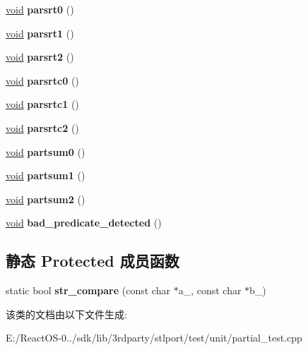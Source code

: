 \begin{DoxyCompactItemize}
\item 
\mbox{\label{class_partial_test_a91345c32abe2a6e55de3c51a1d4bc5a9}} 
\hyperlink{interfacevoid}{void} {\bfseries parsrt0} ()
\item 
\mbox{\label{class_partial_test_afd124d76300cdb873c047247e0a64426}} 
\hyperlink{interfacevoid}{void} {\bfseries parsrt1} ()
\item 
\mbox{\label{class_partial_test_a4b3d49b8299baf8c928e6d4f6fa3bc3e}} 
\hyperlink{interfacevoid}{void} {\bfseries parsrt2} ()
\item 
\mbox{\label{class_partial_test_aa0d81d1099ee5afb7064300d9ab556e8}} 
\hyperlink{interfacevoid}{void} {\bfseries parsrtc0} ()
\item 
\mbox{\label{class_partial_test_abb6b7dfbbed99a49d1a3453ed725819c}} 
\hyperlink{interfacevoid}{void} {\bfseries parsrtc1} ()
\item 
\mbox{\label{class_partial_test_a7d47771c59fdeeede4f60d7683fb53b6}} 
\hyperlink{interfacevoid}{void} {\bfseries parsrtc2} ()
\item 
\mbox{\label{class_partial_test_a91c392bb46c06cb71b73f9d4f6bce973}} 
\hyperlink{interfacevoid}{void} {\bfseries partsum0} ()
\item 
\mbox{\label{class_partial_test_a49f752d69cff7f00bf279a97b56ec1c9}} 
\hyperlink{interfacevoid}{void} {\bfseries partsum1} ()
\item 
\mbox{\label{class_partial_test_ace1656d0bc13a922a764ce8e258118d4}} 
\hyperlink{interfacevoid}{void} {\bfseries partsum2} ()
\item 
\mbox{\label{class_partial_test_ab59e2b5349f375758a7c9815113b68ce}} 
\hyperlink{interfacevoid}{void} {\bfseries bad\+\_\+predicate\+\_\+detected} ()
\end{DoxyCompactItemize}
\subsection*{静态 Protected 成员函数}
\begin{DoxyCompactItemize}
\item 
\mbox{\label{class_partial_test_a9d5edc2b3344d45e302a6cf5f0c68ec7}} 
static bool {\bfseries str\+\_\+compare} (const char $\ast$a\+\_\+, const char $\ast$b\+\_\+)
\end{DoxyCompactItemize}


该类的文档由以下文件生成\+:\begin{DoxyCompactItemize}
\item 
E\+:/\+React\+O\+S-\/0../sdk/lib/3rdparty/stlport/test/unit/partial\+\_\+test.\+cpp\end{DoxyCompactItemize}
